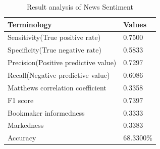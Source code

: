   \begin{table}[h!]
  	\centering
  	\begin{tabular}{|l|l|}
  	\hline
	\textbf{Terminology} & \textbf{Values}\\
	\hline
	Sensitivity(True positive rate) & 0.7500\\
	\hline
	Specificity(True negative rate) & 0.5833\\
	\hline
	Precision(Positive predictive value) & 0.7297\\
	\hline
	Recall(Negative predictive value) & 0.6086\\
	\hline
	Matthews correlation coefficient & 0.3358\\
	\hline
	F1 score & 0.7397\\
	\hline
	Bookmaker informedness & 0.3333\\
	\hline
	Markedness & 0.3383\\
	\hline	
	Accuracy & 68.3300\%\\
	\hline
	\end{tabular}
    \caption{Result analysis of News Sentiment}
	\label{tab:Result analysis of News Sentiment}
  
  \end{table}






